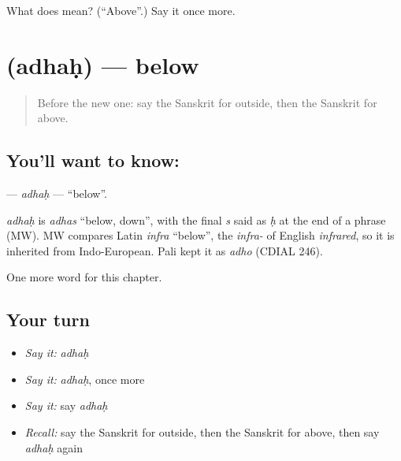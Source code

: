 \begin{tcolorbox}[breakable,colback=teal!4,colframe=teal!35!black,title={Before you move on}]
What does  mean? (\textquotedblleft{}Above\textquotedblright{}.) Say it once more.
\end{tcolorbox}
\section[\texorpdfstring{\sk{अधः} (adhaḥ)}{अधः (adhaḥ)}]{ (adhaḥ) — below}

\label{lesson:SA-C94-adhah}



\begin{quote}
Before the new one: say the Sanskrit for outside, then the Sanskrit for above.
\end{quote}

\subsection*{You'll want to know: }
\textbf{} — \emph{adhaḥ} — \textquotedblleft{}below\textquotedblright{}.

\begin{cousinweb}
\emph{adhaḥ} is \emph{adhas} \textquotedblleft{}below, down\textquotedblright{}, with the final \emph{s} said as \emph{ḥ} at the end of a phrase (MW). MW compares Latin \emph{infra} \textquotedblleft{}below\textquotedblright{}, the \emph{infra-} of English \emph{infrared}, so it is inherited from Indo-European. Pali kept it as \emph{adho} (CDIAL 246).
\end{cousinweb}

\begin{grammarlens}[title={What you've built}]
One more word for this chapter.
\end{grammarlens}

\subsection*{Your turn}
\begin{itemize}
\raggedright
  \item \emph{Say it:} \emph{adhaḥ}
  \item \emph{Say it:} \emph{adhaḥ}, once more
  \item \emph{Say it:} say \emph{adhaḥ}
  \item \emph{Recall:} say the Sanskrit for outside, then the Sanskrit for above, then say \emph{adhaḥ} again
\end{itemize}

